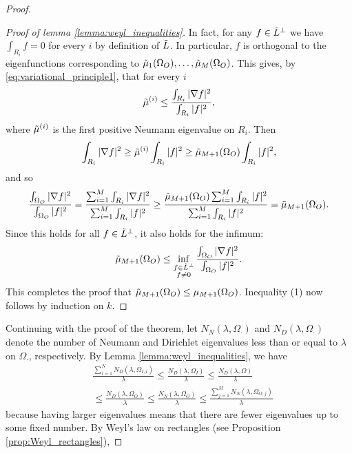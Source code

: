 \documentclass{amsart}
\theoremstyle{definition}
\def\beq{\begin{eqnarray}}
\def\eeq{\end{eqnarray}}
\newcommand{\nn}{\nonumber}
\begin{document}
\begin{proof}
\begin{proof}[Proof of lemma \ref{lemma:weyl_inequalities}]
    In fact, for any $f \in \Tilde{L}^\perp$ we have $\int_{R_i} f = 0$ for every $i$ by definition of $\Tilde{L}$. In particular, $f$ is orthogonal to the eigenfunctions corresponding to $\Tilde{\mu}_1(\Omega_O), \dots, \Tilde{\mu}_M(\Omega_O)$. This gives, by \eqref{eq:variational_principle1}, that for every $i$
    \begin{equation*}
        \Tilde{\mu}^{(i)} \leq \frac{\int_{R_i} |\nabla f|^2}{\int_{R_i} |f|^2},
    \end{equation*}
    where $\Tilde{\mu}^{(i)}$ is the first positive Neumann eigenvalue on $R_i$. Then
    \begin{equation*}
        \int_{R_i} |\nabla f|^2 \geq \Tilde{\mu}^{(i)} \int_{R_i} |f|^2 \geq \Tilde{\mu}_{M+1}(\Omega_O) \int_{R_i} |f|^2,
    \end{equation*}
    and so
    \begin{equation*}
        \frac{\int_{\Omega_O} |\nabla f|^2}{\int_{\Omega_O} |f|^2} = \frac{\sum_{i=1}^M \int_{R_i} |\nabla f|^2}{\sum_{i=1}^M \int_{R_i} |f|^2} \geq \frac{\Tilde{\mu}_{M+1}(\Omega_O) \sum_{i=1}^M \int_{R_i} |f|^2}{\sum_{i=1}^M \int_{R_i} |f|^2} = \Tilde{\mu}_{M+1}(\Omega_O).
    \end{equation*}
    Since this holds for all $f \in \Tilde{L}^\perp$, it also holds for the infimum:
    \begin{equation*}
        \Tilde{\mu}_{M+1}(\Omega_O) \leq \inf_{\substack{f \in \Tilde{L}^\perp \\ f \neq 0}} \frac{\int_{\Omega_O} |\nabla f|^2}{\int_{\Omega_O} |f|^2}.
    \end{equation*}
    This completes the proof that $\Tilde{\mu}_{M+1}(\Omega_O) \leq \mu_{M+1}(\Omega_O)$. Inequality (1) now follows by induction on $k$.
    \end{proof}
    Continuing with the proof of the theorem, let $N_N(\lambda, \Omega_\cdot)$ and $N_D(\lambda, \Omega_\cdot)$ denote the number of Neumann and Dirichlet eigenvalues less than or equal to $\lambda$ on $\Omega_\cdot$, respectively. By Lemma \ref{lemma:weyl_inequalities}, we have
    \beq &    \frac{\sum_{i=1}^N N_D(\lambda, \Omega_{I,i})}{\lambda} \leq \frac{N_D(\lambda, \Omega_I)}{\lambda} \leq \frac{N_D(\lambda, \Omega)}{\lambda} \nn \\ 
    &\leq \frac{N_D(\lambda, \Omega_O)}{\lambda} \leq \frac{N_N(\lambda, \Omega_O)}{\lambda} \leq \frac{\sum_{j=1}^M N_N(\lambda, \Omega_{O,j})}{\lambda}
    \nn \eeq 
    because having larger eigenvalues means that there are fewer eigenvalues up to some fixed number. By Weyl's law on rectangles (see Proposition \ref{prop:Weyl_rectangles}), 

\end{proof}
\end{document}
